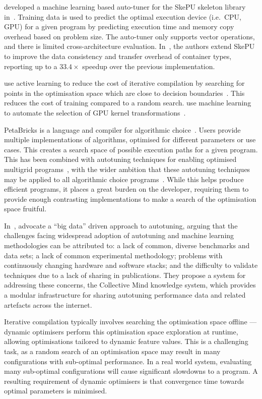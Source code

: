 \citeauthor{Dastgeer2011} developed a machine learning based auto-tuner for the SkePU skeleton library in~\cite{Dastgeer2011}. Training data is used to predict the optimal execution device (i.e.\ CPU, GPU) for a given program by predicting execution time and memory copy overhead based on problem size. The auto-tuner only supports vector operations, and there is limited cross-architecture evaluation. In~\cite{Dastgeer2015a}, the authors extend SkePU to improve the data consistency and transfer overhead of container types, reporting up to a $33.4\times$ speedup over the previous implementation.

\citeauthor{Ogilvie2015} use active learning to reduce the cost of iterative compilation by searching for points in the optimisation space which are close to decision boundaries~\cite{Ogilvie2015}. This reduces the cost of training compared to a random search. \citeauthor{Wahib2015a} use machine learning to automate the selection of GPU kernel transformations~\cite{Wahib2015a}.

PetaBricks is a language and compiler for algorithmic choice~\cite{Ansel2009a}. Users provide multiple implementations of algorithms, optimised for different parameters or use cases. This creates a search space of possible execution paths for a given program. This has been combined with autotuning techniques for enabling optimised multigrid programs~\cite{Chan2009}, with the wider ambition that these autotuning techniques may be applied to all algorithmic choice programs~\cite{Ansel2014}. While this helps produce efficient programs, it places a great burden on the developer, requiring them to provide enough contrasting implementations to make a search of the optimisation space fruitful.

In~\cite{Saclay2010,Memon2013,Fursin2014}, \citeauthor{Fursin2014} advocate a ``big data'' driven approach to autotuning, arguing that the challenges facing widespread adoption of autotuning and machine learning methodologies can be attributed to: a lack of common, diverse benchmarks and data sets; a lack of common experimental methodology; problems with continuously changing hardware and software stacks; and the difficulty to validate techniques due to a lack of sharing in publications. They propose a system for addressing these concerns, the Collective Mind knowledge system, which provides a modular infrastructure for sharing autotuning performance data and related artefacts across the internet.


Iterative compilation typically involves searching the optimisation space offline --- dynamic optimisers perform this optimisation space exploration at runtime, allowing optimisations tailored to dynamic feature values. This is a challenging task, as a random search of an optimisation space may result in many configurations with sub-optimal performance. In a real world system, evaluating many sub-optimal configurations will cause significant slowdowns to a program. A resulting requirement of dynamic optimisers is that convergence time towards optimal parameters is minimised.

